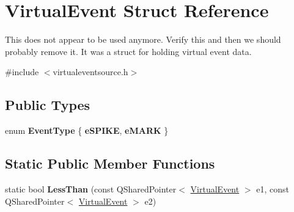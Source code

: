 \hypertarget{struct_virtual_event}{\section{Virtual\-Event Struct Reference}
\label{struct_virtual_event}
}


This does not appear to be used anymore. Verify this and then we should probably remove it. It was a struct for holding virtual event data.  




{\ttfamily \#include $<$virtualeventsource.\-h$>$}

\subsection*{Public Types}
\begin{DoxyCompactItemize}
\item 
enum {\bfseries Event\-Type} \{ {\bfseries e\-S\-P\-I\-K\-E}, 
{\bfseries e\-M\-A\-R\-K}
 \}
\end{DoxyCompactItemize}
\subsection*{Static Public Member Functions}
\begin{DoxyCompactItemize}
\item 
\hypertarget{struct_virtual_event_a6842f418a3593f4f43c9824e62dbb019}{static bool {\bfseries Less\-Than} (const Q\-Shared\-Pointer$<$ \hyperlink{struct_virtual_event}{Virtual\-Event} $>$ e1, const Q\-Shared\-Pointer$<$ \hyperlink{struct_virtual_event}{Virtual\-Event} $>$ e2)}\label{struct_virtual_event_a6842f418a3593f4f43c9824e62dbb019}

\end{DoxyCompactItemize}
